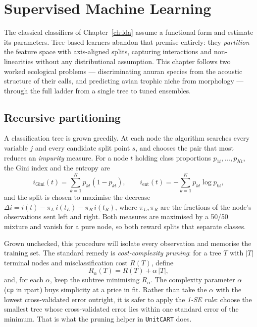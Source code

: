 \documentclass[11pt,oneside]{book}
\newcommand{\code}[1]{\texttt{#1}}
\newcommand{\pkg}[1]{\textsf{#1}}
\begin{document}
\chapter{Supervised Machine Learning}
\label{ch:supml}
The classical classifiers of Chapter~\ref{ch:lda} assume a functional form and estimate its
parameters. Tree-based learners abandon that premise entirely: they \emph{partition}
the feature space with axis-aligned splits, capturing interactions and non-linearities
without any distributional assumption. This chapter follows two worked ecological
problems — discriminating anuran species from the acoustic structure of their calls,
and predicting avian trophic niche from morphology — through the full ladder from a
single tree to tuned ensembles.

\section{Recursive partitioning}
A classification tree is grown greedily. At each node the algorithm searches every
variable $j$ and every candidate split point $s$, and chooses the pair that most reduces
an \emph{impurity} measure. For a node $t$ holding class proportions $p_{1t},\dots,p_{Kt}$,
the Gini index and the entropy are
\[
  i_{\text{Gini}}(t)=\sum_{k=1}^{K}p_{kt}(1-p_{kt}),
  \qquad
  i_{\text{ent}}(t)=-\sum_{k=1}^{K}p_{kt}\log p_{kt},
\]
and the split is chosen to maximise the decrease
$\Delta i = i(t) - \pi_L\, i(t_L) - \pi_R\, i(t_R)$, where $\pi_L,\pi_R$ are the fractions
of the node's observations sent left and right. Both measures are maximised by a
50/50 mixture and vanish for a pure node, so both reward splits that separate classes.

Grown unchecked, this procedure will isolate every observation and memorise the training
set. The standard remedy is \emph{cost-complexity pruning}: for a tree $T$ with $|T|$
terminal nodes and misclassification cost $R(T)$, define
\[
  R_\alpha(T) = R(T) + \alpha\,|T| ,
\]
and, for each $\alpha$, keep the subtree minimising $R_\alpha$. The complexity parameter
$\alpha$ (\code{cp} in \pkg{rpart}) buys simplicity at a price in fit. Rather than take the
$\alpha$ with the lowest cross-validated error outright, it is safer to apply the
\emph{1-SE rule}: choose the smallest tree whose cross-validated error lies within one
standard error of the minimum. That is what the pruning helper in \code{UnitCART} does.
\end{document}
